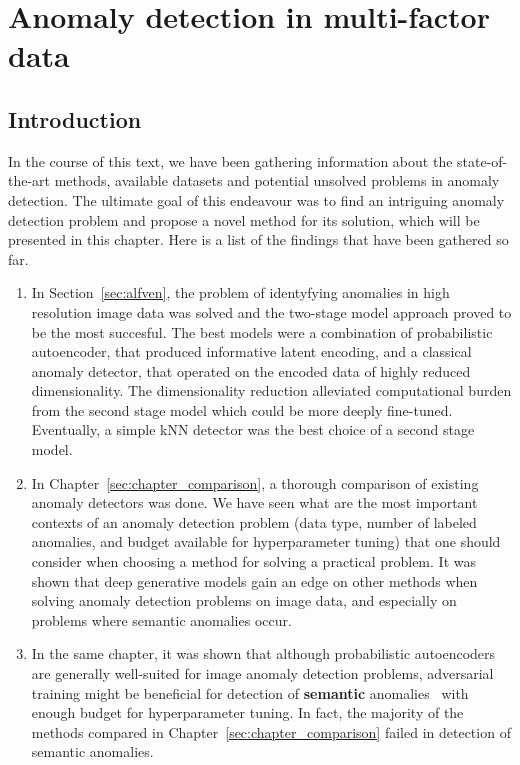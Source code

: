 \chapter{Anomaly detection in multi-factor data} \label{sec:chapter_sgvaegan}

\section{Introduction}

In the course of this text, we have been gathering information about the state-of-the-art methods, available datasets and potential unsolved problems in anomaly detection. The ultimate goal of this endeavour was to find an intriguing anomaly detection problem and propose a novel method for its solution, which will be presented in this chapter. Here is a list of the findings that have been gathered so far.

\begin{enumerate}
    \item In Section~\ref{sec:alfven}, the problem of identyfying anomalies in high resolution image data was solved and the two-stage model approach proved to be the most succesful. The best models were a combination of probabilistic autoencoder, that produced informative latent encoding, and a classical anomaly detector, that operated on the encoded data of highly reduced dimensionality. The dimensionality reduction alleviated computational burden from the second stage model which could be more deeply fine-tuned. Eventually, a simple kNN detector was the best choice of a second stage model. 
    \item In Chapter~\ref{sec:chapter_comparison}, a thorough comparison of existing anomaly detectors was done. We have seen what are the most important contexts of an anomaly detection problem (data type, number of labeled anomalies, and budget available for hyperparameter tuning) that one should consider when choosing a method for solving a practical problem. It was shown that deep generative models gain an edge on other methods when solving anomaly detection problems on image data, and especially on problems where semantic anomalies occur. 
    \item In the same chapter, it was shown that although probabilistic autoencoders are generally well-suited for image anomaly detection problems, adversarial training might be beneficial for detection of \textbf{semantic} anomalies~\cite{ahmed2020detecting} with enough budget for hyperparameter tuning. In fact, the majority of the methods compared in Chapter~\ref{sec:chapter_comparison} failed in detection of semantic anomalies.
\end{enumerate}

